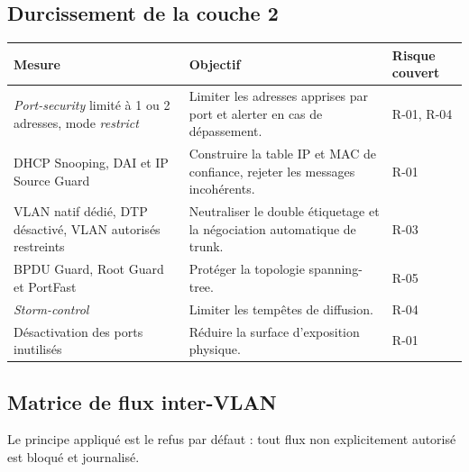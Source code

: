 \documentclass[11pt,a4paper]{article}
\begin{document}
\subsection{Durcissement de la couche 2}\label{sec:durcissement}
\begin{table}[H]
\centering
\begin{tabularx}{\textwidth}{L{5.2cm} Y C{2.0cm}}
\toprule
{}\textbf{Mesure} & \textbf{Objectif} & \textbf{Risque couvert} \\
\midrule
\textit{Port-security} limité à 1 ou 2 adresses, mode \textit{restrict} & Limiter les adresses apprises par port et alerter en cas de dépassement. & R-01, R-04 \\
DHCP Snooping, DAI et IP Source Guard & Construire la table IP et MAC de confiance, rejeter les messages incohérents. & R-01 \\
VLAN natif dédié, DTP désactivé, VLAN autorisés restreints & Neutraliser le double étiquetage et la négociation automatique de trunk. & R-03 \\
BPDU Guard, Root Guard et PortFast & Protéger la topologie spanning-tree. & R-05 \\
\textit{Storm-control} & Limiter les tempêtes de diffusion. & R-04 \\
Désactivation des ports inutilisés & Réduire la surface d'exposition physique. & R-01 \\
\bottomrule
\end{tabularx}
\end{table}

\subsection{Matrice de flux inter-VLAN}
Le principe appliqué est le refus par défaut : tout flux non explicitement autorisé est bloqué et journalisé.
\end{document}
